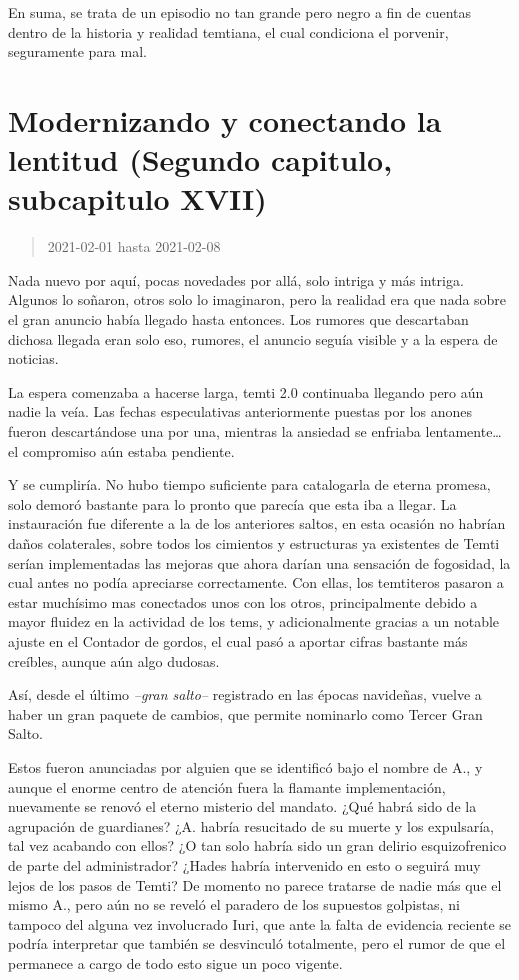\documentclass[
  spanish,
]{book}
\begin{document}
En suma, se trata de un episodio no tan grande pero negro a fin de cuentas dentro de la historia y realidad temtiana, el cual condiciona el porvenir, seguramente para mal.

\hypertarget{modernizando-y-conectando-la-lentitud-segundo-capitulo-subcapitulo-xvii}{%
\section{Modernizando y conectando la lentitud (Segundo capitulo, subcapitulo XVII)}\label{modernizando-y-conectando-la-lentitud-segundo-capitulo-subcapitulo-xvii}}

\begin{quote}
2021-02-01 hasta 2021-02-08
\end{quote}

Nada nuevo por aquí, pocas novedades por allá, solo intriga y más intriga. Algunos lo soñaron, otros solo lo imaginaron, pero la realidad era que nada sobre el gran anuncio había llegado hasta entonces. Los rumores que descartaban dichosa llegada eran solo eso, rumores, el anuncio seguía visible y a la espera de noticias.

La espera comenzaba a hacerse larga, temti 2.0 continuaba llegando pero aún nadie la veía. Las fechas especulativas anteriormente puestas por los anones fueron descartándose una por una, mientras la ansiedad se enfriaba lentamente\ldots{} el compromiso aún estaba pendiente.

Y se cumpliría. No hubo tiempo suficiente para catalogarla de eterna promesa, solo demoró bastante para lo pronto que parecía que esta iba a llegar. La instauración fue diferente a la de los anteriores saltos, en esta ocasión no habrían daños colaterales, sobre todos los cimientos y estructuras ya existentes de Temti serían implementadas las mejoras que ahora darían una sensación de fogosidad, la cual antes no podía apreciarse correctamente. Con ellas, los temtiteros pasaron a estar muchísimo mas conectados unos con los otros, principalmente debido a mayor fluidez en la actividad de los tems, y adicionalmente gracias a un notable ajuste en el Contador de gordos, el cual pasó a aportar cifras bastante más creíbles, aunque aún algo dudosas.

Así, desde el último \emph{--gran salto--} registrado en las épocas navideñas, vuelve a haber un gran paquete de cambios, que permite nominarlo como Tercer Gran Salto.

Estos fueron anunciadas por alguien que se identificó bajo el nombre de A., y aunque el enorme centro de atención fuera la flamante implementación, nuevamente se renovó el eterno misterio del mandato. ¿Qué habrá sido de la agrupación de guardianes? ¿A. habría resucitado de su muerte y los expulsaría, tal vez acabando con ellos? ¿O tan solo habría sido un gran delirio esquizofrenico de parte del administrador? ¿Hades habría intervenido en esto o seguirá muy lejos de los pasos de Temti?
De momento no parece tratarse de nadie más que el mismo A., pero aún no se reveló el paradero de los supuestos golpistas, ni tampoco del alguna vez involucrado Iuri, que ante la falta de evidencia reciente se podría interpretar que también se desvinculó totalmente, pero el rumor de que el permanece a cargo de todo esto sigue un poco vigente.
\end{document}

